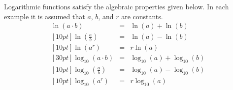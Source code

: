 
Logarithmic functions satisfy the algebraic properties given below. In
each example it is assumed that $a$, $b$, and $r$ are constants. 
\begin{eqnarray}
  \ln(a\cdot b) & = & \ln(a) + \ln(b) \\ [10pt]
  \ln\left(\frac{a}{b}\right) & = & \ln(a) - \ln(b) \\  [10pt]
  \ln\left(a^r\right) & = & r \ln(a) \\ [30pt]
  \log_{10}(a\cdot b) & = & \log_{10}(a) + \log_{10}(b) \\ [10pt]
  \log_{10}\left(\frac{a}{b}\right) & = & \log_{10}(a) - \log_{10}(b) \\  [10pt]
  \log_{10}\left(a^r\right) & = & r \log_{10}(a)
\end{eqnarray}



